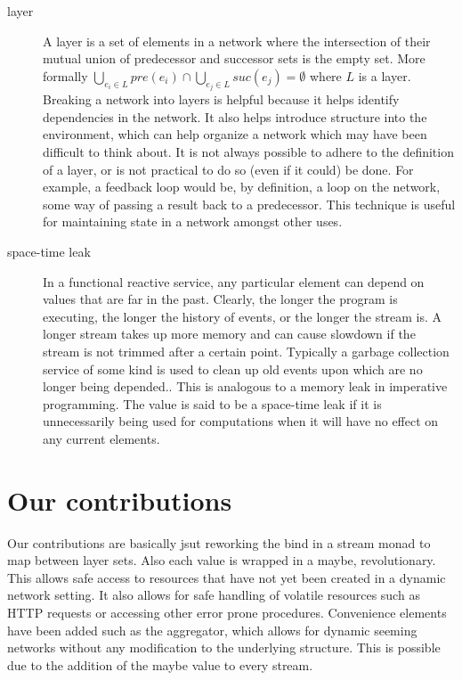 \documentclass[twocolumn,11pt,english]{article}
\begin{document}
\begin{description}
\item[layer] A layer is a set of elements in a network where the intersection of their mutual union of predecessor and successor sets is the empty set. More formally $\bigcup_{e_i \in L}{pre(e_i)} \cap \bigcup_{e_j \in L}{suc(e_j)} = \emptyset$ where $L$ is a layer. Breaking a network into layers is helpful because it helps identify dependencies in the network. It also helps introduce structure into the environment, which can help organize a network which may have been difficult to think about. It is not always possible to adhere to the definition of a layer, or is not practical to do so (even if it could) be done. For example, a feedback loop would be, by definition, a loop on the network, some way of passing a result back to a predecessor. This technique is useful for maintaining state in a network amongst other uses.


\item[space-time leak] In a functional reactive service, any particular element can depend on values that are far in the past. Clearly, the longer the program is executing, the longer the history of events, or the longer the stream is. A longer stream takes up more memory and can cause slowdown if the stream is not trimmed after a certain point. Typically a garbage collection service of some kind is used to clean up old events upon which are no longer being depended.. This is analogous to a memory leak in imperative programming. The value is said to be a space-time leak if it is unnecessarily being used for computations when it will have no effect on any current elements.
\end{description}


\section{Our contributions}
Our contributions are basically jsut reworking the bind in a stream monad to map between layer sets. Also each value is wrapped in a maybe, revolutionary. This allows safe access to resources that have not yet been created in a dynamic network setting. It also allows for safe handling of volatile resources such as HTTP requests or accessing other error prone procedures. Convenience elements have been added such as the aggregator, which allows for dynamic seeming networks without any modification to the underlying structure. This is possible due to the addition of the maybe value to every stream.
\end{document}
